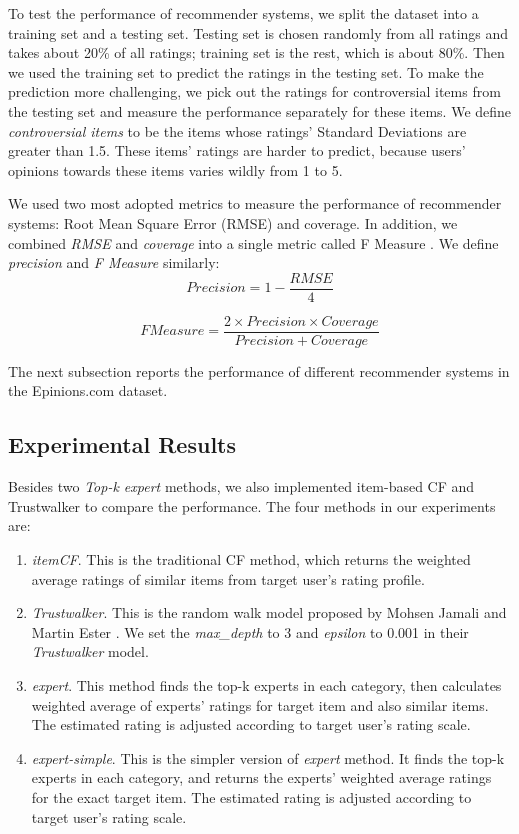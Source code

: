 \documentclass[12pt]{article}
\begin{document}
To test the performance of recommender systems, we split the dataset into a training set and a testing set. Testing set is chosen randomly from all ratings and takes about 20\% of all ratings; training set is the rest, which is about 80\%. Then we used the training set to predict the ratings in the testing set. To make the prediction more challenging, we pick out the ratings for controversial items from the testing set and measure the performance separately for these items. We define \emph{controversial items} to be the items whose ratings' Standard Deviations are greater than 1.5. These items' ratings are harder to predict, because users' opinions towards these items varies wildly from 1 to 5. 

We used two most adopted metrics to measure the performance of recommender systems: Root Mean Square Error (RMSE) and coverage. In addition, we combined \emph{RMSE} and \emph{coverage} into a single metric called F Measure \cite{Jamali:2009p67}. We define \emph{precision} and \emph{F Measure} similarly:
\begin{equation}
Precision = 1 - \frac{RMSE}{4}
\end{equation}

\begin{equation}
F Measure = \frac{2 \times Precision \times Coverage}{Precision + Coverage}
\end{equation}

The next subsection reports the performance of different recommender systems in the Epinions.com dataset. 

\subsection{Experimental Results}
Besides two \emph{Top-k expert} methods, we also implemented item-based CF and Trustwalker to compare the performance. The four methods in our experiments are:

\begin{enumerate}
	\item \emph{itemCF}. This is the traditional CF method, which returns the weighted average ratings of similar items from target user's rating profile. 
	\item \emph{Trustwalker}. This is the random walk model proposed by Mohsen Jamali and Martin Ester \cite{Jamali:2009p67}. We set the \emph{max\_depth} to 3 and \emph{epsilon} to 0.001 in their \emph{Trustwalker} model.
	\item \emph{expert}. This method finds the top-k experts in each category, then calculates weighted average of experts' ratings for target item and also similar items. The estimated rating is adjusted according to target user's rating scale. 
	\item \emph{expert-simple}. This is the simpler version of \emph{expert} method. It finds the top-k experts in each category, and returns the experts' weighted average ratings for the exact target item. The estimated rating is adjusted according to target user's rating scale. 
\end{enumerate}
\end{document}
